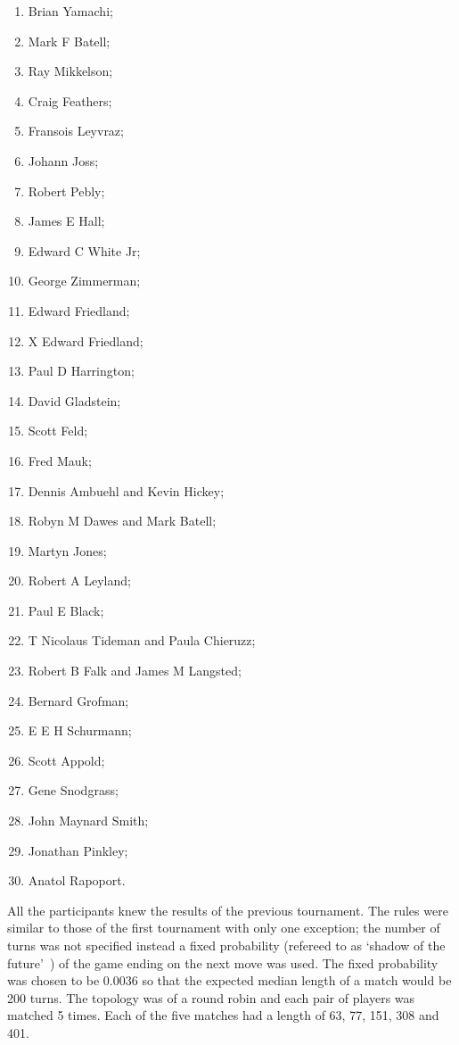 \documentclass{article}
\theoremstyle{definition}
\begin{document}
\begin{multicols}{3}
\begin{enumerate}
        \item Brian Yamachi;
        \item Mark F Batell;
        \item Ray Mikkelson;
        \item Craig Feathers;
        \item Fransois Leyvraz;
        \item Johann Joss;
        \item Robert Pebly;
        \item James E Hall;
        \item Edward C White Jr;
        \item George Zimmerman;
        \item Edward Friedland;
        \item X	Edward Friedland;
        \item Paul D Harrington;
        \item David Gladstein;
        \item Scott Feld;
        \item Fred Mauk;
        \item Dennis Ambuehl and Kevin Hickey;
        \item Robyn M Dawes and Mark Batell;
        \item Martyn Jones;
        \item Robert A Leyland;
        \item Paul E Black;
        \item T Nicolaus Tideman and Paula Chieruzz;
        \item Robert B Falk and James M Langsted;
        \item Bernard Grofman;
        \item E E H Schurmann;
        \item Scott Appold;
        \item Gene Snodgrass;
        \item John Maynard Smith;
        \item Jonathan Pinkley;
        \item Anatol Rapoport.
    \end{enumerate}
\end{multicols}

All the participants knew the results of the previous tournament. The rules
were similar to those of the first tournament with only one exception;
the number of turns was not specified instead a fixed probability (refereed to as
`shadow of the future'~\cite{Axelrod1988}) of the game ending on the next move
was used. The fixed probability was chosen to be 0.0036 so that the expected
median length of a match would be 200 turns. The topology was of a round robin
and each pair of players was matched 5 times. Each of the five matches had a
length of 63, 77, 151, 308 and 401.
\end{document}
